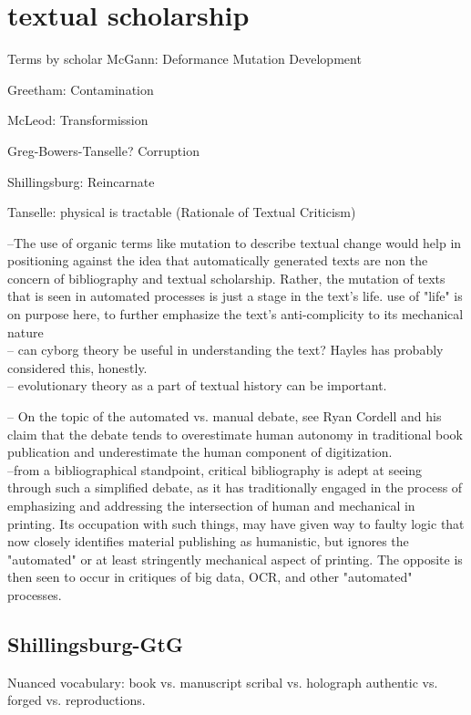 \documentclass[course, english]{Notes}
\begin{document}
	
\section{textual scholarship}
Terms by scholar
McGann:
	Deformance
	Mutation
	Development
	
Greetham:
	Contamination
	
McLeod: 
	Transformission
	
Greg-Bowers-Tanselle?
	Corruption

Shillingsburg: 
	Reincarnate

Tanselle: 
	physical is tractable (Rationale of Textual Criticism)

--{The use of organic terms like mutation to describe textual change would help in positioning against the idea that automatically generated texts are non the concern of bibliography and textual scholarship. Rather, the mutation of texts that is seen in automated processes is just a stage in the text's life.}
		 {use of "life" is on purpose here, to further emphasize the text's anti-complicity to its mechanical nature}
		\\-- {can cyborg theory be useful in understanding the text? Hayles has probably considered this, honestly.}
		\\-- {evolutionary theory as a part of textual history can be important.}
		
-- On the topic of the automated vs. manual debate, see Ryan Cordell and his claim that the debate tends to overestimate human autonomy in traditional book publication and underestimate the human component of digitization. 
\\--from a bibliographical standpoint, critical bibliography is adept at seeing through such a simplified debate, as it has traditionally engaged in the process of emphasizing and addressing the intersection of human and mechanical in printing. Its occupation with such things, may have given way to faulty logic that now closely identifies material publishing as humanistic, but ignores the "automated" or at least stringently mechanical aspect of printing. The opposite is then seen to occur in critiques of big data, OCR, and other "automated" processes. 
		
		

\subsection{Shillingsburg-GtG}
Nuanced vocabulary:
book vs. manuscript
scribal vs. holograph
authentic vs. forged vs. reproductions.
\end{document}
